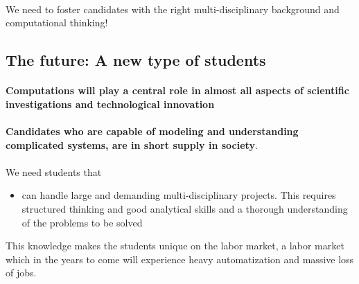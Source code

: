 \documentclass[%
twoside,                 %
final,                   %
10pt]{article}
\begin{document}
\noindent




\paragraph{}
We need to foster candidates with the right
multi-disciplinary background and computational thinking!




\subsection*{The future: A new type of students}


\paragraph{}
\textbf{Computations will play a central role in almost all aspects of scientific investigations and technological innovation}




\paragraph{}
\textbf{Candidates who are capable of modeling and understanding complicated systems, are in short supply in society}.



\paragraph{}
We need students that
\begin{itemize}
\item can handle large and demanding multi-disciplinary  projects. This requires structured thinking and good analytical skills and a thorough understanding of the problems to be solved
\end{itemize}

\noindent
This knowledge makes the students unique on the labor market, a labor market which in the years to come will experience heavy automatization and massive loss of jobs.



\end{document}
